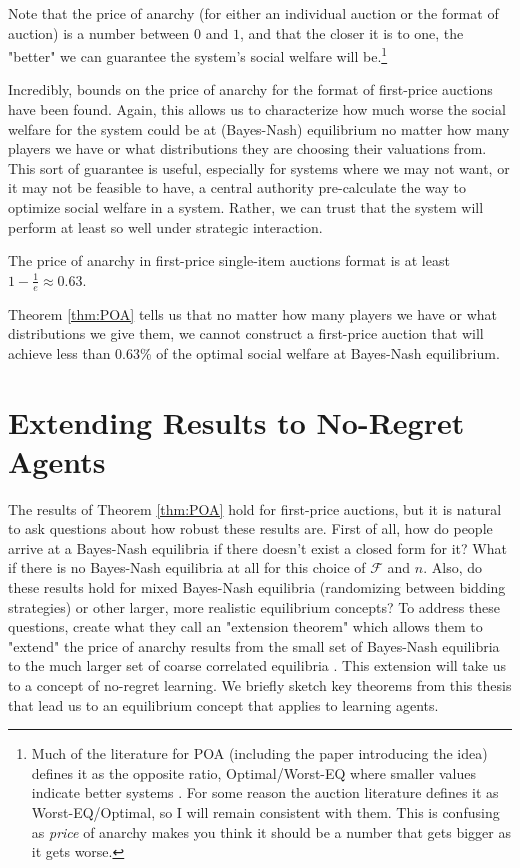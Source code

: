\documentclass[12pt,twoside]{reedthesis}
\begin{document}
Note that the price of anarchy (for either an individual auction or the format of auction) is a number between $0$ and $1$, and that the closer it is to one, the "better" we can guarantee the system's social welfare will be.\footnote{Much of the literature for POA (including the paper introducing the idea) defines it as the opposite ratio, Optimal/Worst-EQ where smaller values indicate better systems \citep{Koutsoupias1999}. For some reason the auction literature defines it as Worst-EQ/Optimal, so I will remain consistent with them. This is confusing as {\em price} of anarchy makes you think it should be a number that gets bigger as it gets worse.}

Incredibly, bounds on the price of anarchy for the format of first-price auctions have been found. Again, this allows us to characterize how much worse the social welfare for the system could be at (Bayes-Nash) equilibrium no matter how many players we have or what distributions they are choosing their valuations from. This sort of guarantee is useful, especially for systems where we may not want, or it may not be feasible to have, a central authority pre-calculate the way to optimize social welfare in a system. Rather, we can trust that the system will perform at least so well under strategic interaction.

\begin{theorem}{\citep{Syrgkanis2013}}
	The price of anarchy in first-price single-item auctions format is at least $1-\frac{1}{e} \approx 0.63$.
	\label{thm:POA}	
\end{theorem}

Theorem \ref{thm:POA} tells us that no matter how many players we have or what distributions we give them, we cannot construct a first-price auction that will achieve less than $0.63$\% of the optimal social welfare at Bayes-Nash equilibrium. 
 
\section{Extending Results to No-Regret Agents}
The results of Theorem \ref{thm:POA} hold for first-price auctions, but it is natural to ask questions about how robust these results are. First of all, how do people arrive at a Bayes-Nash equilibria if there doesn't exist a closed form for it? What if there is no Bayes-Nash equilibria at all for this choice of $\mathcal{F}$ and $n$. Also, do these results hold for mixed Bayes-Nash equilibria (randomizing between bidding strategies) or other larger, more realistic equilibrium concepts? To address these questions, \cite{Roughgarden2017} create what they call an "extension theorem" which allows them to "extend" the price of anarchy results from the small set of Bayes-Nash equilibria to the much larger set of coarse correlated equilibria \citep[p.~60]{Roughgarden2017}. This extension will take us to a concept of no-regret learning. We briefly sketch key theorems from this thesis that lead us to an equilibrium concept that applies to learning agents.
\end{document}
